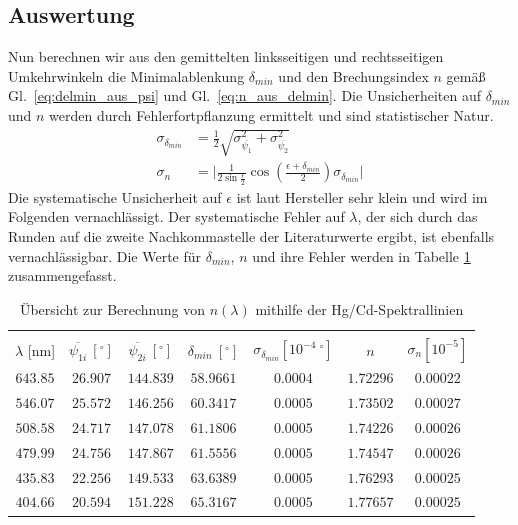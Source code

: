 \documentclass[12pt,a4paper]{article}
\begin{document}
\subsection{Auswertung}
Nun berechnen wir aus den gemittelten linksseitigen und rechtsseitigen Umkehrwinkeln die Minimalablenkung $\delta_{min}$ und den Brechungsindex $n$ gemäß Gl.~\eqref{eq:delmin_aus_psi} und Gl.~\eqref{eq:n_aus_delmin}. Die Unsicherheiten auf $\delta_{min}$ und $n$ werden durch Fehlerfortpflanzung ermittelt und sind statistischer Natur.
\begin{align}
\sigma_{\delta_{min}}&=\frac{1}{2}\sqrt{\sigma_{\overline{\psi_1}}^2+\sigma_{\overline{\psi_2}}^2}\\
\sigma_n&=\Big|\frac{1}{2\sin{\frac{\epsilon}{2}}}\cos{\left(\frac{\epsilon+\delta_{min}}{2}\right)}\sigma_{\delta_{min}}\Big|
\end{align}
Die systematische Unsicherheit auf $\epsilon$ ist laut Hersteller sehr klein und wird im Folgenden vernachlässigt. Der systematische Fehler auf $\lambda$, der sich durch das Runden auf die zweite Nachkommastelle der Literaturwerte ergibt, ist ebenfalls vernachlässigbar. Die Werte für  $\delta_{min}$, $n$ und ihre Fehler werden in Tabelle \ref{table:CdHg_Rechnung} zusammengefasst.\\
\begin{table}[H]
	\centering
	\begin{tabular}{|c|c|c|c|c|c|c|}
		\hline
		&&&&&&\\
		$\lambda$ [nm]&$\overline{\psi_{1i}}\ [^{\circ}]$&$\overline{\psi_{2i}}\ [^{\circ}]$&$\delta_{min}\ [^{\circ}]$&$\sigma_{\delta_{min}}[10^{-4}\ ^{\circ}]$& $n$ & $\sigma_{n}[10^{-5}]$\\
		\hline
		$643.85$&$26.907$&$144.839$&$58.9661$&$0.0004$&$1.72296$&$0.00022$\\
		$546.07$&$25.572$&$146.256$&$60.3417$&$0.0005$&$1.73502$&$0.00027$\\
		$508.58$&$24.717$&$147.078$&$61.1806$&$0.0005$&$1.74226$&$0.00026$\\
		$479.99$&$24.756$&$147.867$&$61.5556$&$0.0005$&$1.74547$&$0.00026$\\
		$435.83$&$22.256$&$149.533$&$63.6389$&$0.0005$&$1.76293$&$0.00025$\\
		$404.66$&$20.594$&$151.228$&$65.3167$&$0.0005$&$1.77657$&$0.00025$\\
		\hline
	\end{tabular}
	\caption{Übersicht zur Berechnung von $n(\lambda)$ mithilfe der Hg/Cd-Spektrallinien}
	\label{table:CdHg_Rechnung}
\end{table}
\end{document}
